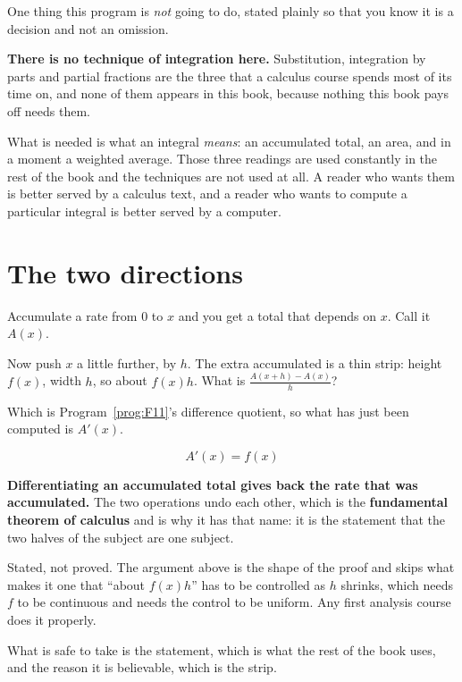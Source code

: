 \begin{fr}
One thing this program is \emph{not} going to do, stated plainly so that you
know it is a decision and not an omission.

\textbf{There is no technique of integration here.} Substitution, integration
by parts and partial fractions are the three that a calculus course spends
most of its time on, and none of them appears in this book, because nothing
this book pays off needs them.

What is needed is what an integral \emph{means}: an accumulated total, an
area, and in a moment a weighted average. Those three readings are used
constantly in the rest of the book and the techniques are not used at all. A
reader who wants them is better served by a calculus text, and a reader who
wants to compute a particular integral is better served by a computer.
\end{fr}

\section{The two directions}
\label{sec:F13-inverse}

\begin{fr}
Accumulate a rate from $0$ to $x$ and you get a total that depends on $x$.
Call it $A(x)$.

Now push $x$ a little further, by $h$. The extra accumulated is a thin strip:
height $f(x)$, width $h$, so about $f(x)h$. What is
$\frac{A(x+h) - A(x)}{h}$?
\dotline
\nextframe
\end{fr}

\begin{fr}
Which is Program~\ref{prog:F11}'s difference quotient, so what has just been
computed is $A'(x)$.

\[ A'(x) = f(x) \]

\textbf{Differentiating an accumulated total gives back the rate that was
accumulated.} The two operations undo each other, which is the
\textbf{fundamental theorem of calculus} and is why it has that name: it is
the statement that the two halves of the subject are one subject.

\begin{rigourbox}
Stated, not proved. The argument above is the shape of the proof and skips
what makes it one \dash{} that \enquote{about $f(x)h$} has to be controlled as
$h$ shrinks, which needs $f$ to be continuous and needs the control to be
uniform. Any first analysis course does it properly.

What is safe to take is the statement, which is what the rest of the book
uses, and the reason it is believable, which is the strip.
\end{rigourbox}
\end{fr}

